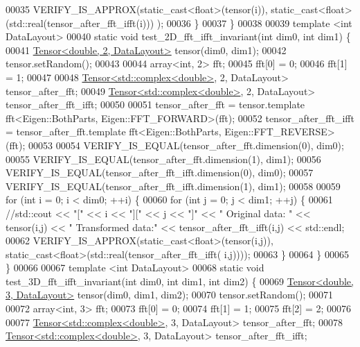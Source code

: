 \begin{DoxyCode}
00035     VERIFY\_IS\_APPROX(static\_cast<float>(tensor(i)), static\_cast<float>(std::real(tensor\_after\_fft\_ifft(i)))
      );
00036   \}
00037 \}
00038 
00039 \textcolor{keyword}{template} <\textcolor{keywordtype}{int} DataLayout>
00040 \textcolor{keyword}{static} \textcolor{keywordtype}{void} test\_2D\_fft\_ifft\_invariant(\textcolor{keywordtype}{int} dim0, \textcolor{keywordtype}{int} dim1) \{
00041   \hyperlink{class_eigen_1_1_tensor}{Tensor<double, 2, DataLayout>} tensor(dim0, dim1);
00042   tensor.setRandom();
00043 
00044   array<int, 2> fft;
00045   fft[0] = 0;
00046   fft[1] = 1;
00047 
00048   \hyperlink{class_eigen_1_1_tensor}{Tensor<std::complex<double>}, 2, DataLayout> tensor\_after\_fft;
00049   \hyperlink{class_eigen_1_1_tensor}{Tensor<std::complex<double>}, 2, DataLayout> tensor\_after\_fft\_ifft;
00050 
00051   tensor\_after\_fft = tensor.template fft<Eigen::BothParts, Eigen::FFT\_FORWARD>(fft);
00052   tensor\_after\_fft\_ifft = tensor\_after\_fft.template fft<Eigen::BothParts, Eigen::FFT\_REVERSE>(fft);
00053 
00054   VERIFY\_IS\_EQUAL(tensor\_after\_fft.dimension(0), dim0);
00055   VERIFY\_IS\_EQUAL(tensor\_after\_fft.dimension(1), dim1);
00056   VERIFY\_IS\_EQUAL(tensor\_after\_fft\_ifft.dimension(0), dim0);
00057   VERIFY\_IS\_EQUAL(tensor\_after\_fft\_ifft.dimension(1), dim1);
00058 
00059   \textcolor{keywordflow}{for} (\textcolor{keywordtype}{int} i = 0; i < dim0; ++i) \{
00060     \textcolor{keywordflow}{for} (\textcolor{keywordtype}{int} j = 0; j < dim1; ++j) \{
00061       \textcolor{comment}{//std::cout << "[" << i << "][" << j << "]" <<  "  Original data: " << tensor(i,j) << " Transformed
       data:" << tensor\_after\_fft\_ifft(i,j) << std::endl;}
00062       VERIFY\_IS\_APPROX(static\_cast<float>(tensor(i,j)), static\_cast<float>(std::real(tensor\_after\_fft\_ifft(
      i,j))));
00063     \}
00064   \}
00065 \}
00066 
00067 \textcolor{keyword}{template} <\textcolor{keywordtype}{int} DataLayout>
00068 \textcolor{keyword}{static} \textcolor{keywordtype}{void} test\_3D\_fft\_ifft\_invariant(\textcolor{keywordtype}{int} dim0, \textcolor{keywordtype}{int} dim1, \textcolor{keywordtype}{int} dim2) \{
00069   \hyperlink{class_eigen_1_1_tensor}{Tensor<double, 3, DataLayout>} tensor(dim0, dim1, dim2);
00070   tensor.setRandom();
00071 
00072   array<int, 3> fft;
00073   fft[0] = 0;
00074   fft[1] = 1;
00075   fft[2] = 2;
00076 
00077   \hyperlink{class_eigen_1_1_tensor}{Tensor<std::complex<double>}, 3, DataLayout> tensor\_after\_fft;
00078   \hyperlink{class_eigen_1_1_tensor}{Tensor<std::complex<double>}, 3, DataLayout> tensor\_after\_fft\_ifft;

\end{DoxyCode}
